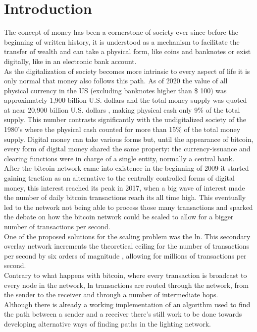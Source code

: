 \section{Introduction}

The concept of money has been a cornerstone of society ever since before the beginning of written history, it is understood as a mechanism to facilitate the transfer of wealth and can take a physical form, like coins and banknotes or exist digitally, like in an electronic bank account. \\
As the digitalization of society becomes more intrinsic to every aspect of life it is only normal that money also follows this path. As of 2020 the value of all physical currency in the US (excluding banknotes higher than \$ 100) was approximately 1,900 billion U.S. dollars \cite{currcir} and the total money supply was quoted at near 20,900 billion U.S. dollars \cite{mzm}, making physical cash only 9\% of the total supply. This number contrasts significantly with the undigitalized society of the 1980's where the physical cash counted for more than 15\% of the total money supply.
Digital money can take various forms but, until the appearance of bitcoin, every form of digital money shared the same property: the currency-issuance and clearing functions were in charge of a single entity, normally a central bank. \\
After the bitcoin network came into existence in the beginning of 2009 it started gaining traction as an alternative to the centrally controlled forms of digital money, this interest reached its peak in 2017, when a big wave of interest made the number of daily bitcoin transactions reach its all time high. This eventually led to the network not being able to process those many transactions and sparked the debate on how the bitcoin network could be scaled to allow for a bigger number of transactions per second. \\
One of the proposed solutions for the scaling problem was the \acrfull{ln}. This secondary overlay network increments the theoretical ceiling for the number of transactions per second by six orders of magnitude \cite{lightning_network}, allowing for millions of transactions per second.\\
Contrary to what happens with bitcoin, where every transaction is broadcast to every node in the network, \acrshort{ln} transactions are routed through the network, from the sender to the receiver and through a number of intermediate hops.\\
Although there is already a working implementation of an algorithm used to find the path between a sender and a receiver there's still work to be done towards developing alternative ways of finding paths in the lighting network.
